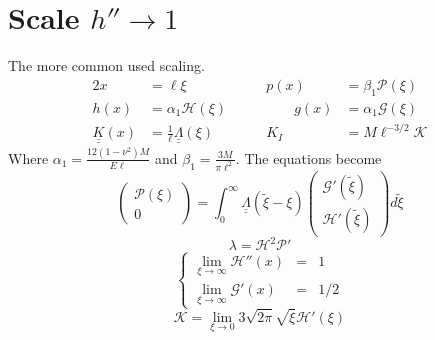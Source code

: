 \documentclass{article}
\newcommand{\sP}{\mathscr{P}}
\newcommand{\sH}{\mathscr{H}}
\newcommand{\sG}{\mathscr{G}}
\newcommand{\sK}{\mathscr{K}}
\begin{document}
\section{Scale $h''\to1$}
The more common used scaling.
\begin{alignat*}{2}
x &= \ell \xi  & p(x) &= \beta_1 \sP (\xi) \\
h(x) &= \alpha_1 \sH(\xi) \qquad & \qquad g(x) &= \alpha_1 \sG(\xi) \\
\underline{\underline{K}}(x) &= \frac{1}{\ell} 
\underline{\underline{\Lambda}}(\xi) & 
K_I &= M \ell^{-3/2} \sK 
\end{alignat*}
Where  $\displaystyle \alpha_1 = \frac{12(1-\nu^2)M}{E\ell}$ and  
$\displaystyle \beta_1 = \frac{3M}{\pi \ell^2}$.
The equations become
\\
\begin{equation}
 \left( \begin{array}{c} \sP(\xi) \\ 0 \end{array} \right) =
\int_0^{\infty} 
\underline{\underline{\Lambda}}(\tilde{\xi}- \xi) 
\left( \begin{array}{c} \sG'(\tilde{\xi}) \\[4pt] \sH'(\tilde{\xi}) \end{array} 
\right) d\tilde{\xi}
\end{equation}
%
\begin{equation}
\lambda  = \sH^2 \sP'
\end{equation}
%
\begin{equation}
\left\{ \begin{array}{ccc}
\lim_{\xi\to\infty} \sH''(x) & = & 1 \\[4pt]
\lim_{\xi\to\infty} \sG'(x) & = & 1/2  
\end{array} \right.
\end{equation}
%
\begin{equation}
\sK = \lim_{\xi\to 0} 3 \sqrt{2\pi} \sqrt{\xi} \sH'(\xi)
\end{equation}
\end{document}
